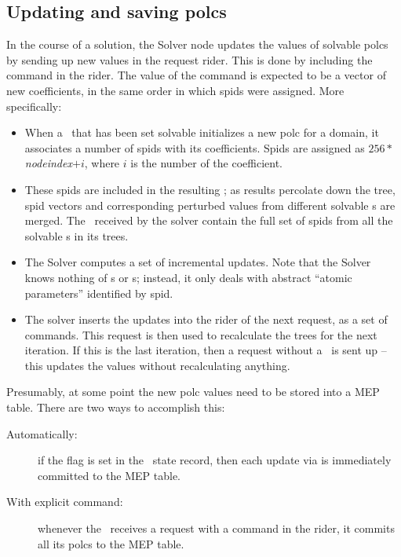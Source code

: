 \documentclass[10pt,twoside]{book}
\begin{document}
\subsection{Updating and saving polcs}    

  In the course of a solution, the Solver node updates the values of solvable
  polcs by sending up new values in the request rider. This is done by
  including the  command in the rider. The value of the
  command is expected to be a vector of new coefficients, in the same order in
  which spids were assigned. More specifically:

  \begin{itemize}
  
  \item When a \Parm\ that has been set solvable initializes a new polc for a
  domain, it associates a number of spids with its coefficients. Spids are
  assigned as $256*${\em nodeindex}$+i$, where $i$ is the number of the
  coefficient.
  
  \item These spids are included in the resulting \Vells; as results percolate
  down the tree, spid vectors and corresponding perturbed values from different
  solvable \Parm{}s are merged. The \Vells\ received by the solver contain the
  full set of spids from all the solvable \Parm{}s in its trees.

  \item The Solver computes a set of incremental updates. Note that the Solver
  knows nothing of \Polc{}s or \Parm{}s; instead, it only deals with abstract
  ``atomic parameters'' identified by spid.

  \item The solver inserts the updates into the rider of the next request, as
  a set of  commands. This request is then used to recalculate
  the trees for the next iteration. If this is the last iteration, then a
  request without a \Cells\ is sent up -- this updates the values without
  recalculating anything.
  
  \end{itemize}
  
  Presumably, at some point the new polc values need to be stored into a MEP
  table. There are two ways to accomplish this:

  \begin{description}
  
  \item[Automatically:] if the  flag is set in the \Parm\ state
  record, then each update via  is immediately committed to the
  MEP table.

  \item[With explicit command:] whenever the \Parm\ receives a request with a
   command in the rider, it commits all its polcs to the MEP
  table.

  \end{description}
  
\end{document}

